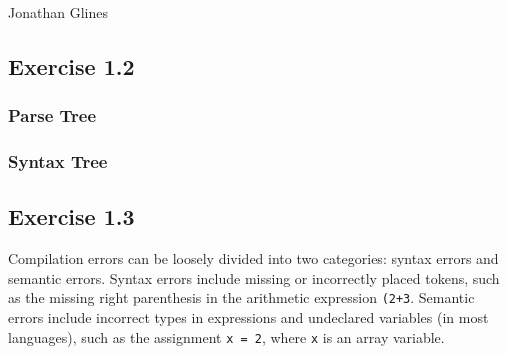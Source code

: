 \documentclass[12pt]{article}
\begin{document}
\begin{flushright}
\Large{Jonathan Glines}
\end{flushright}
\subsection*{Exercise 1.2}
\subsubsection*{Parse Tree}
\subsubsection*{Syntax Tree}

\subsection*{Exercise 1.3}
Compilation errors can be loosely divided into two categories: syntax errors and semantic errors. Syntax errors include missing or incorrectly placed tokens, such as the missing right parenthesis in the arithmetic expression {\tt (2+3}. Semantic errors include incorrect types in expressions and undeclared variables (in most languages), such as the assignment {\tt x = 2}, where {\tt x} is an array variable.
\end{document}
